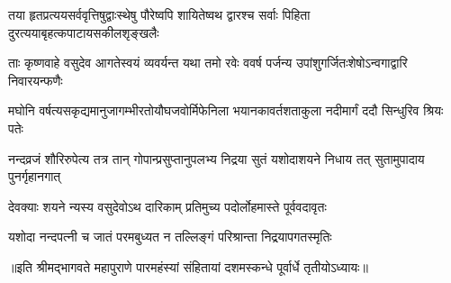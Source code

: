 \fourlineindentedshloka
{तया हृतप्रत्ययसर्ववृत्तिषु}{द्वाःस्थेषु पौरेष्वपि शायितेष्वथ}
{द्वारश्च सर्वाः पिहिता दुरत्यया}{बृहत्कपाटायसकीलशृङ्खलैः} %

\fourlineindentedshloka
{ताः कृष्णवाहे वसुदेव आगते}{स्वयं व्यवर्यन्त यथा तमो रवेः}
{ववर्ष पर्जन्य उपांशुगर्जितः}{शेषोऽन्वगाद्वारि निवारयन्फणैः} %

\fourlineindentedshloka
{मघोनि वर्षत्यसकृद्यमानुजा}{गम्भीरतोयौघजवोर्मिफेनिला}
{भयानकावर्तशताकुला नदी}{मार्गं ददौ सिन्धुरिव श्रियः पतेः} %

\fourlineindentedshloka
{नन्दव्रजं शौरिरुपेत्य तत्र तान्}
{गोपान्प्रसुप्तानुपलभ्य निद्रया}
{सुतं यशोदाशयने निधाय तत्}
{सुतामुपादाय पुनर्गृहानगात्} %

\twolineshloka
{देवक्याः शयने न्यस्य वसुदेवोऽथ दारिकाम्}
{प्रतिमुच्य पदोर्लोहमास्ते पूर्ववदावृतः} %

\twolineshloka
{यशोदा नन्दपत्नी च जातं परमबुध्यत}
{न तल्लिङ्गं परिश्रान्ता निद्रयापगतस्मृतिः}


॥इति श्रीमद्भागवते महापुराणे पारमहंस्यां संहितायां दशमस्कन्धे पूर्वार्धे तृतीयोऽध्यायः॥

